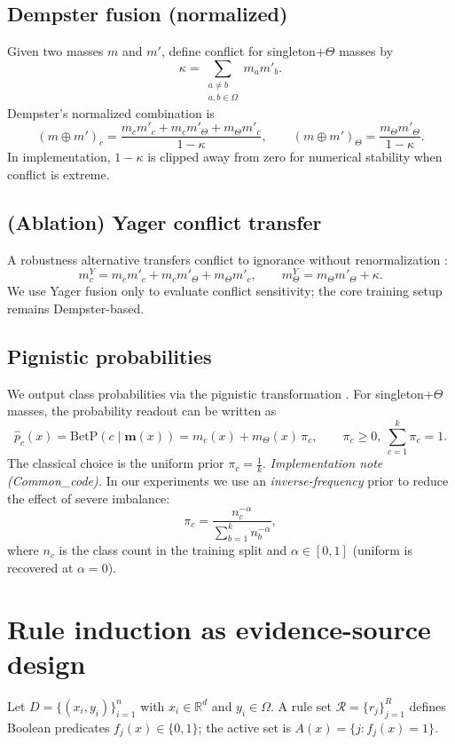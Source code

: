 \documentclass[11pt,a4paper]{article}
\providecommand{\mb}[1]{#1}
\renewcommand{\mb}[1]{\bm{#1}}
\providecommand{\mc}[1]{#1}
\renewcommand{\mc}[1]{\mathcal{#1}}
\providecommand{\1}{}
\renewcommand{\1}{\mathbbm{1}}
\newcommand{\BetP}{\mathrm{BetP}}
\begin{document}
\subsection{Dempster fusion (normalized)}
Given two masses $m$ and $m'$, define conflict for singleton+$\Theta$ masses by
\[
\kappa = \sum_{\substack{a\neq b\\ a,b\in\Omega}} m_a m'_b.
\]
Dempster's normalized combination is
\[
(m\oplus m')_c
=
\frac{m_c m'_c + m_c m'_{\Theta} + m_{\Theta} m'_c}{1-\kappa},
\qquad
(m\oplus m')_{\Theta}
=
\frac{m_{\Theta}m'_{\Theta}}{1-\kappa}.
\]
In implementation, $1-\kappa$ is clipped away from zero for numerical stability when conflict is extreme.

\subsection{(Ablation) Yager conflict transfer}
A robustness alternative transfers conflict to ignorance without renormalization \cite{Yager1987}:
\[
m^{Y}_c = m_c m'_c + m_c m'_{\Theta} + m_{\Theta} m'_c,
\qquad
m^{Y}_{\Theta} = m_{\Theta}m'_{\Theta} + \kappa.
\]
We use Yager fusion only to evaluate conflict sensitivity; the core training setup remains Dempster-based.

\subsection{Pignistic probabilities}
We output class probabilities via the pignistic transformation \cite{Smets2005}. For singleton+$\Theta$ masses, the probability readout can be written as
\[
\hat p_c(x)=\BetP(c\mid \mb{m}(x)) = m_c(x) + m_{\Theta}(x)\,\pi_c,
\qquad
\pi_c \ge 0,\ \sum_{c=1}^k \pi_c = 1.
\]
The classical choice is the uniform prior $\pi_c=\tfrac{1}{k}$.
\textit{Implementation note (Common\_code).} In our experiments we use an \emph{inverse-frequency} prior to reduce the effect of severe imbalance:
\[
\pi_c = \frac{n_c^{-\alpha}}{\sum_{b=1}^k n_b^{-\alpha}},
\]
where $n_c$ is the class count in the training split and $\alpha\in[0,1]$ (uniform is recovered at $\alpha=0$).

\section{Rule induction as evidence-source design}
Let $D=\{(x_i,y_i)\}_{i=1}^n$ with $x_i\in\mathbb{R}^d$ and $y_i\in\Omega$.
A rule set $\mc{R}=\{r_j\}_{j=1}^R$ defines Boolean predicates $f_j(x)\in\{0,1\}$;
the active set is $A(x)=\{j: f_j(x)=1\}$.
\end{document}

